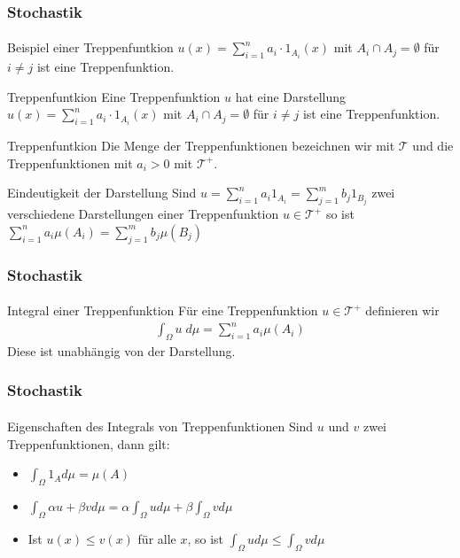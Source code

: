 \documentclass{beamer}
\begin{document}
\begin{frame}
    \frametitle{Stochastik}
\framesubtitle{}

    \begin{block}{Beispiel  einer Treppenfuntkion}
         $u(x) = \sum_{i= 1}^n a_i \cdot  1_{A_i}(x)$ mit $A_i \cap A_j = \emptyset$ für $i \neq j$ ist eine Treppenfunktion.
    \end{block}


    \begin{block}{Treppenfuntkion}
        Eine Treppenfunktion  $u$ hat eine Darstellung
        $u(x) = \sum_{i= 1}^n a_i \cdot  1_{A_i}(x)$ mit $A_i \cap A_j = \emptyset$ für $i \neq j$ ist eine Treppenfunktion.
   \end{block}


    \begin{block}{Treppenfuntkion}
        Die Menge der Treppenfunktionen bezeichnen wir mit $\mathcal{T}$ und die Treppenfunktionen mit $a_i > 0$ mit $\mathcal{T}^+$.        
    \end{block}
    
    \begin{block}{Eindeutigkeit der Darstellung}
        Sind $u = \sum_{i= 1}^n a_i 1_{A_i} = \sum_{j= 1}^m b_j 1_{B_j}$ zwei verschiedene Darstellungen einer Treppenfunktion 
        $u \in \mathcal{T}^+$
        so ist $\sum_{i= 1}^n a_i \mu (A_i) = \sum_{j= 1}^m b_j \mu (B_j)$
    \end{block}




\end{frame}


\begin{frame}
    \frametitle{Stochastik}
\framesubtitle{}
    \begin{block}{Integral einer Treppenfunktion}
        Für eine Treppenfunktion $u \in \mathcal{T}^+$ definieren wir
\begin{align*}
    \int_\Omega u \; d\mu= \sum_{i=1}^n a_i \mu(A_i)
\end{align*}
Diese ist unabhängig von der Darstellung.
    \end{block}

\end{frame}


\begin{frame}
    \frametitle{Stochastik}
\framesubtitle{}
\begin{block}{Eigenschaften des Integrals von Treppenfunktionen}
    Sind $u$ und $v$ zwei Treppenfunktionen, dann gilt:
    \begin{itemize}
    \item $\int_{\Omega} 1_A  d\mu  = \mu (A)$  
    \item $\int_{\Omega} \alpha u  + \beta v d\mu = \alpha \int_{\Omega}  u d\mu + \beta  \int_{\Omega}  v d\mu$
    \item Ist $u(x) \leq v(x)$ für alle $x$, so ist $\int_{\Omega} u d\mu \leq \int_{\Omega} v d\mu$ 
    \end{itemize}
    \end{block}
\end{frame}
\end{document}

